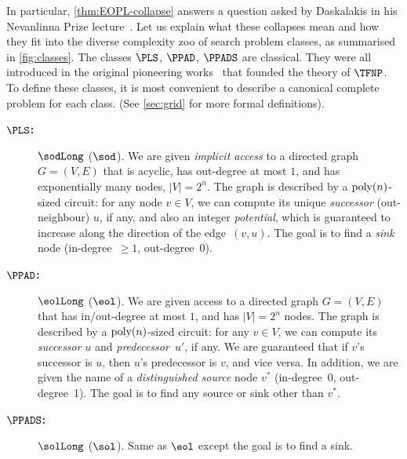 \documentclass[10pt,a4paper]{article}
\theoremstyle{definition}
\theoremstyle{plain}
\theoremstyle{remark}
\newcommand{\poly}{\textup{poly}}
\begin{document}
In particular, \cref{thm:EOPL-collapse} answers a question asked by Daskalakis in his Nevanlinna Prize lecture~\cite[Open Question 10]{Daskalakis2019}. Let us explain what these collapses mean and how they fit into the diverse complexity zoo of search problem classes, as summarised in \cref{fig:classes}. The classes $\PLS$, $\PPAD$, $\PPADS$ are classical. They were all introduced in the original pioneering works~\cite{Megiddo1991, Johnson1988,Papadimitriou1994} that founded the theory of $\TFNP$. To define these classes, it is most convenient to describe a canonical complete problem for each class. (See \cref{sec:grid} for more formal definitions).
\begin{description}
\item[\bf $\PLS$:] $\sodLong$ ($\sod$). We are given \emph{implicit access} to a directed graph $G=(V,E)$ that is acyclic, has out-degree at most $1$, and has exponentially many nodes, $|V|=2^n$. The graph is described by a $\poly(n)$-sized circuit: for any node $v\in V$, we can compute its unique \emph{successor} (out-neighbour) $u$, if any, and also an integer \emph{potential}, which is guaranteed to increase along the direction of the edge~$(v,u)$. The goal is to find a \emph{sink} node (in-degree~$\geq 1$, out-degree~0).

\item[\bf $\PPAD$:] $\eolLong$ ($\eol$). We are given access to a directed graph $G=(V,E)$ that has in/out-degree at most $1$, and has $|V|=2^n$ nodes. The graph is described by a $\poly(n)$-sized circuit: for any $v\in V$, we can compute its \emph{successor} $u$ and \emph{predecessor}~$u'$, if any. We are guaranteed that if $v$'s successor is $u$, then $u$'s predecessor is $v$, and vice versa. In addition, we are given the name of a \emph{distinguished source} node $v^*$ (in-degree~0, out-degree~1). The goal is to find any source or sink other than $v^*$.

\item[\bf $\PPADS$:] $\solLong$ ($\sol$). Same as $\eol$ except the goal is to find a sink.
\end{description}
\end{document}

